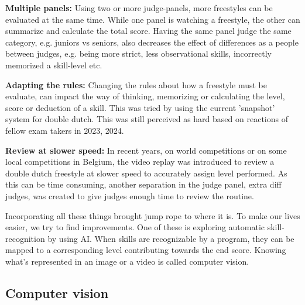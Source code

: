 \textbf{Multiple panels:} Using two or more judge-panels, more freestyles can be evaluated at the same time. While one panel is watching a freestyle, the other can summarize and calculate the total score. Having the same panel judge the same category, e.g. juniors vs seniors, also decreases the effect of differences as a people between judges, e.g. being more strict, less observational skills, incorrectly memorized a skill-level etc.

\textbf{Adapting the rules:} Changing the rules about how a freestyle must be evaluate, can impact the way of thinking, memorizing or calculating the level, score or deduction of a skill. This was tried by using the current 'snapshot' system for double dutch. This was still perceived as hard based on reactions of fellow exam takers in 2023, 2024.

\textbf{Review at slower speed:} In recent years, on world competitions or on some local competitions in Belgium, the video replay was introduced to review a double dutch freestyle at slower speed to accurately assign level performed. As this can be time consuming, another separation in the judge panel, extra diff judges, was created to give judges enough time to review the routine.

\medskip

Incorporating all these things brought jump rope to where it is. To make our lives easier, we try to find improvements. One of these is exploring automatic skill-recognition by using AI. When skills are recognizable by a program, they can be mapped to a corresponding level contributing towards the end score. Knowing what's represented in an image or a video is called computer vision. %

\subsection{Computer vision}
\label{subsec:computer vision}

